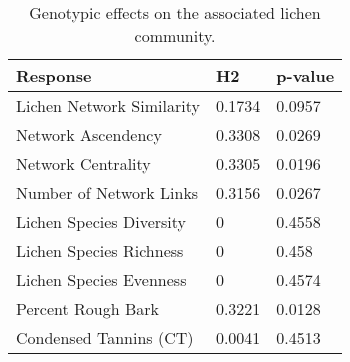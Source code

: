 \begin{table}[ht]
\centering
\begin{tabular}{lll}
  \hline
Response & H2 & p-value \\ 
  \hline
Lichen Network Similarity & 0.1734 & 0.0957 \\ 
  Network Ascendency & 0.3308 & 0.0269 \\ 
  Network Centrality & 0.3305 & 0.0196 \\ 
  Number of Network Links & 0.3156 & 0.0267 \\ 
  Lichen Species Diversity & 0 & 0.4558 \\ 
  Lichen Species Richness & 0 & 0.458 \\ 
  Lichen Species Evenness & 0 & 0.4574 \\ 
  Percent Rough Bark & 0.3221 & 0.0128 \\ 
  Condensed Tannins (CT) & 0.0041 & 0.4513 \\ 
   \hline
\end{tabular}
\caption{Genotypic effects on the associated lichen community.} 
\label{tab:h2_table}
\end{table}
